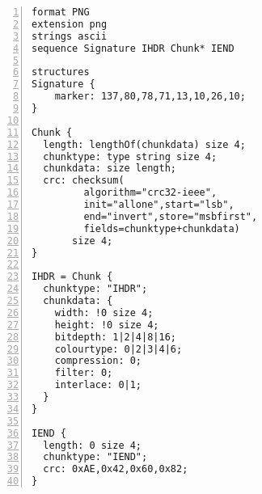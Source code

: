 \begin{multicols}{2}
\begin{lstlisting}[language=derric, numbers=left, numberstyle=\tiny, numbersep=1pt]
format PNG
extension png
strings ascii
sequence Signature IHDR Chunk* IEND

structures
Signature {
    marker: 137,80,78,71,13,10,26,10; 
}

Chunk {
  length: lengthOf(chunkdata) size 4;
  chunktype: type string size 4;
  chunkdata: size length;
  crc: checksum(
         algorithm="crc32-ieee",
         init="allone",start="lsb",
         end="invert",store="msbfirst",
         fields=chunktype+chunkdata)
       size 4; 
}

IHDR = Chunk {
  chunktype: "IHDR";
  chunkdata: {
    width: !0 size 4;
    height: !0 size 4;
    bitdepth: 1|2|4|8|16;
    colourtype: 0|2|3|4|6;
    compression: 0;
    filter: 0;
    interlace: 0|1;
  }
}

IEND {
  length: 0 size 4;
  chunktype: "IEND";
  crc: 0xAE,0x42,0x60,0x82;
}
\end{lstlisting}
\end{multicols}


